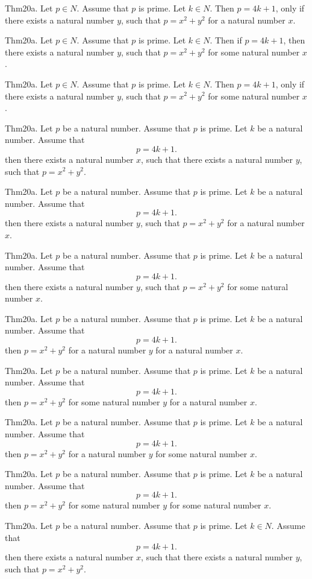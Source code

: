 \documentclass{article}
\begin{document}
Thm20a. Let $p \in N$. Assume that $p$ is prime. Let $k \in N$. Then $p = 4 k + 1$, only if there exists a natural number $y$, such that $p = x ^{ 2}+ y ^{ 2}$ for a natural number $x$.

Thm20a. Let $p \in N$. Assume that $p$ is prime. Let $k \in N$. Then if $p = 4 k + 1$, then there exists a natural number $y$, such that $p = x ^{ 2}+ y ^{ 2}$ for some natural number $x$.

Thm20a. Let $p \in N$. Assume that $p$ is prime. Let $k \in N$. Then $p = 4 k + 1$, only if there exists a natural number $y$, such that $p = x ^{ 2}+ y ^{ 2}$ for some natural number $x$.

Thm20a. Let $p$ be a natural number. Assume that $p$ is prime. Let $k$ be a natural number. Assume that $$p = 4 k + 1.$$ then there exists a natural number $x$, such that there exists a natural number $y$, such that $p = x ^{ 2}+ y ^{ 2}$.

Thm20a. Let $p$ be a natural number. Assume that $p$ is prime. Let $k$ be a natural number. Assume that $$p = 4 k + 1.$$ then there exists a natural number $y$, such that $p = x ^{ 2}+ y ^{ 2}$ for a natural number $x$.

Thm20a. Let $p$ be a natural number. Assume that $p$ is prime. Let $k$ be a natural number. Assume that $$p = 4 k + 1.$$ then there exists a natural number $y$, such that $p = x ^{ 2}+ y ^{ 2}$ for some natural number $x$.

Thm20a. Let $p$ be a natural number. Assume that $p$ is prime. Let $k$ be a natural number. Assume that $$p = 4 k + 1.$$ then $p = x ^{ 2}+ y ^{ 2}$ for a natural number $y$ for a natural number $x$.

Thm20a. Let $p$ be a natural number. Assume that $p$ is prime. Let $k$ be a natural number. Assume that $$p = 4 k + 1.$$ then $p = x ^{ 2}+ y ^{ 2}$ for some natural number $y$ for a natural number $x$.

Thm20a. Let $p$ be a natural number. Assume that $p$ is prime. Let $k$ be a natural number. Assume that $$p = 4 k + 1.$$ then $p = x ^{ 2}+ y ^{ 2}$ for a natural number $y$ for some natural number $x$.

Thm20a. Let $p$ be a natural number. Assume that $p$ is prime. Let $k$ be a natural number. Assume that $$p = 4 k + 1.$$ then $p = x ^{ 2}+ y ^{ 2}$ for some natural number $y$ for some natural number $x$.

Thm20a. Let $p$ be a natural number. Assume that $p$ is prime. Let $k \in N$. Assume that $$p = 4 k + 1.$$ then there exists a natural number $x$, such that there exists a natural number $y$, such that $p = x ^{ 2}+ y ^{ 2}$.
\end{document}
